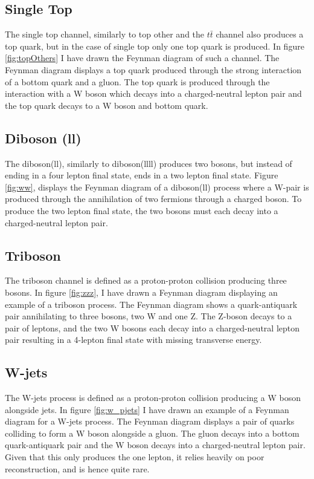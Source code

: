 \subsection*{Single Top}
The single top channel, similarly to top other and the $t\bar{t}$ channel also produces a top quark, but in the case of single top 
only one top quark is produced. In figure \ref{fig:topOthers} I have drawn the Feynman diagram of such a channel. The Feynman diagram displays a
top quark produced through the strong interaction of a bottom quark and a gluon. The top quark is produced through the interaction with a W boson 
which decays into a charged-neutral lepton pair and the top quark decays to a W boson and bottom quark. 

\subsection*{Diboson (ll)}
The diboson(ll), similarly to diboson(llll) produces two bosons, but instead of ending in a four lepton final state, ends in a two lepton final state.
Figure \ref{fig:ww}, displays the Feynman diagram of a diboson(ll) process where a W-pair is produced through the annihilation of two fermions through 
a charged boson. To produce the two lepton final state, the two bosons must each decay into a charged-neutral lepton pair. 

\subsection*{Triboson}
The triboson channel is defined as a proton-proton collision producing three bosons.  In figure \ref{fig:zzz}, I have drawn a Feynman diagram 
displaying an example of a triboson process. The Feynman diagram shows a quark-antiquark pair annihilating to three bosons, two W and one Z. The Z-boson decays 
to a pair of leptons, and the two W bosons each decay into a charged-neutral lepton pair resulting in a 4-lepton final state with missing transverse energy.

\subsection*{W-jets}
The W-jets process is defined as a proton-proton collision producing a W boson alongside jets. In figure \ref{fig:w_pjets} I have drawn an example 
of a Feynman diagram for a W-jets process. The Feynman diagram displays a pair of quarks colliding to form a W boson alongside a gluon. The gluon decays 
into a bottom quark-antiquark pair and the W boson decays into a charged-neutral lepton pair. Given that this only produces the one lepton, it 
relies heavily on poor reconstruction, and is hence quite rare.

